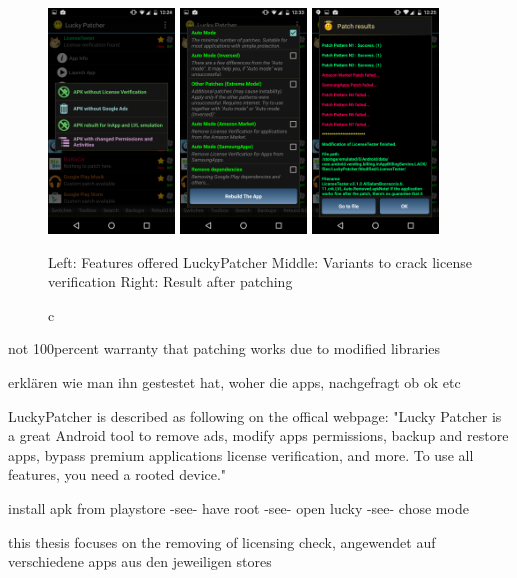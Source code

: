 \begin{figure}[h]
    \centering
    \includegraphics[width=0.3\textwidth]{data/luckyFeatures.png}
    \includegraphics[width=0.3\textwidth]{data/luckyModi.png}
    \includegraphics[width=0.3\textwidth]{data/luckyPatching.png}
    \caption{c}{Left: Features offered LuckyPatcher
    Middle: Variants to crack license verification
    Right: Result after patching}
    \label{fig:luckyScreen}
\end{figure}

not 100percent warranty that patching works due to modified libraries


erklären wie man ihn gestestet hat, woher die apps, nachgefragt ob ok etc

LuckyPatcher is described as following on the offical webpage: "Lucky Patcher is a great Android tool to remove ads, modify apps permissions, backup and restore apps, bypass premium applications license verification, and more. To use all features, you need a rooted device." \cite{luckyPatcherOfficial}

install apk from playstore -see- have root -see- open lucky -see- chose mode


this thesis focuses on the removing of licensing check, angewendet auf verschiedene apps aus den jeweiligen stores
